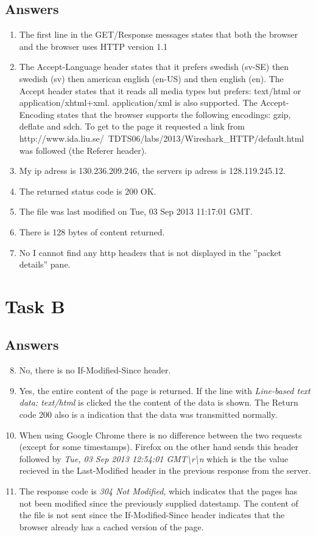 \documentclass[a4paper,11pt]{article}
\begin{document}
\subsection{Answers}
\begin{enumerate}
  \item The first line in the GET/Response messages states that both the browser and the browser uses HTTP version 1.1
  \item The Accept-Language header states that it prefers swedish (sv-SE) then swedish (sv) then american english (en-US) and then english (en).
    The Accept header states that it reads all media types but prefers: text/html or application/xhtml+xml. application/xml is also supported.
    The Accept-Encoding states that the browser supports the following encodings: gzip, deflate and sdch.
    To get to the page it requested a link from http://www.ida.liu.se/~TDTS06/labs/2013/Wireshark\_HTTP/default.html was followed (the Referer header).
  \item My ip adress is 130.236.209.246, the servers ip adress is 128.119.245.12.
  \item The returned status code is 200 OK.
  \item The file was last modified on Tue, 03 Sep 2013 11:17:01 GMT.
  \item There is 128 bytes of content returned.
  \item No I cannot find any http headers that is not displayed in the ''packet details'' pane.
\end{enumerate}

\section{Task B}

\subsection{Answers}
\begin{enumerate}
    \setcounter{enumi}{7}
  \item No, there is no If-Modified-Since header.
  \item Yes, the entire content of the page is returned. If the line with \emph{Line-based text data: text/html} is clicked the the content of the data is shown. The Return code 200 also is a indication that the data was transmitted normally.
  \item When using Google Chrome there is no difference between the two requests (except for some timestamps). 
    Firefox on the other hand sends this header followed by \emph{Tue, 03 Sep 2013 12:54:01 GMT\textbackslash r\textbackslash n} which is the the value recieved in the Last-Modified header in the previous response from the server.
  \item The response code is \emph{304 Not Modified}, which indicates that the pages has not been modified since the previously supplied datestamp. The content of the file is not sent since the If-Modified-Since header indicates that the browser already has a cached version of the page.
\end{enumerate}
\end{document}
